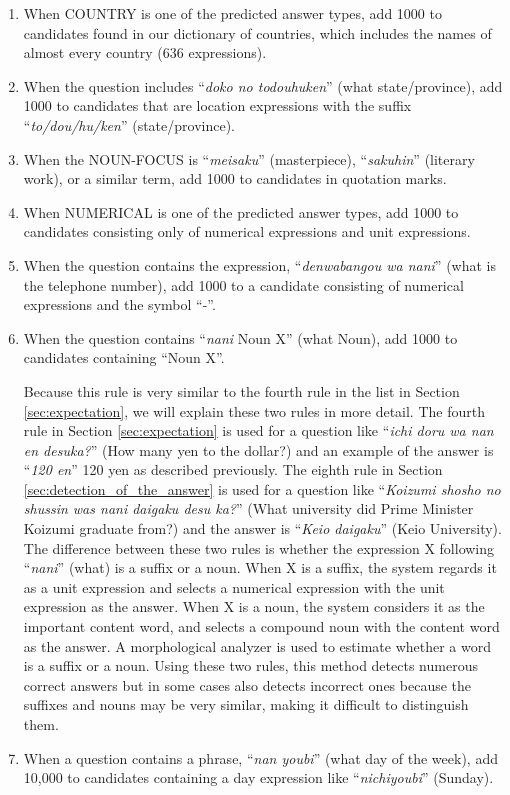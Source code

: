 \begin{enumerate}
\item 
When COUNTRY is one of the predicted answer types, add 1000 to candidates 
found in our dictionary of countries, which includes the names of almost every country
(636 expressions). 

\item 
When the question includes ``{\it doko no todouhuken}'' (what state/province), add 1000 
to candidates that are location expressions with the suffix ``{\it to/dou/hu/ken}'' (state/province). 

\item 
When the NOUN-FOCUS is ``{\it meisaku}'' (masterpiece), ``{\it sakuhin}'' (literary work), or a similar term, 
add 1000 to candidates in quotation marks. 

\item 
When NUMERICAL is one of the predicted answer types, add 1000 to candidates 
consisting only of numerical expressions and unit expressions. 

\item 
When the question contains the expression, ``{\it denwabangou wa nani}'' (what is the telephone number), 
add 1000 to a candidate consisting of numerical expressions and the symbol ``-''. 

\item 
When the question contains ``{\it nani} Noun X'' (what Noun), add 1000 to candidates 
containing ``Noun X''. 

Because this rule is very similar to the fourth rule in the list in Section \ref{sec:expectation}, 
we will explain these two rules in more detail. 
The fourth rule in Section \ref{sec:expectation} is used for a question like 
``{\it ichi doru wa nan en desuka?}'' (How many yen to the dollar?) 
and an example of the answer is ``{\it 120 en}'' 120 yen as described previously. 
The eighth rule in Section \ref{sec:detection_of_the_answer} is used for a question like 
``{\it Koizumi shosho no shussin was nani daigaku desu ka?}'' (What university did Prime Minister Koizumi graduate from?) 
and the answer is ``{\it Keio daigaku}'' (Keio University). 
The difference between these two rules is whether 
the expression X following ``{\it nani}'' (what) is a suffix or a noun. 
When X is a suffix, 
the system regards it as a unit expression 
and selects a numerical expression with the unit expression as the answer. 
When X is a noun, 
the system considers it as the important content word, 
and selects a compound noun with the content word as the answer. 
A morphological analyzer is used to estimate whether a word is a suffix or a noun. 
Using these two rules, this method 
detects numerous correct answers but
in some cases also 
detects incorrect ones 
because the suffixes and nouns may be very similar, making it difficult to distinguish them. 

\item 
When a question contains a phrase, ``{\it nan youbi}'' (what day of the week), add 
10,000 to candidates containing a day expression like ``{\it nichiyoubi}'' (Sunday).

\end{enumerate}

